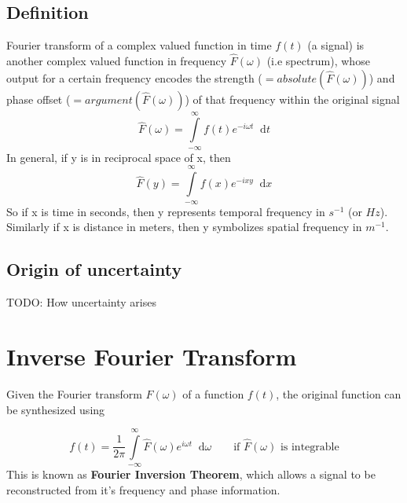 \documentclass[11pt, a4paper]{article}
\let\oldsection\section
\renewcommand{\section}{%
	\setcounter{equation}{0}%
	\oldsection%
}
\newcommand{\diff}{\mathop{}\!\mathrm{d}}
\newcommand{\dx}{\diff x}
\newcommand{\dt}{\diff t}
\newcommand{\domega}{\diff \omega}
\newcommand{\dint}[2]{\int \limits_{#1}^{#2}}  %
\newcommand{\intinfty}{\dint{-\infty}{\infty}}	%
\begin{document}
	\subsection{Definition}\label{sec:fourier_transform_def}  %
	Fourier transform of a complex valued function in time $f(t)$ (a signal) is another complex valued function in frequency $\hat{F}(\omega)$ (i.e spectrum), whose output for a certain frequency encodes the strength ($=absolute(\hat{F}(\omega))$) and phase offset ($=argument(\hat{F}(\omega))$) of that frequency within the original signal \cite{herman2016fourieranalysis}
	\begin{equation}\label{eq:ft_def}
		\boxed{
			\hat{F}(\omega) = \intinfty f(t)e^{-i\omega t} \dt
		}
	\end{equation}
	In general, if y is in reciprocal space of x, then
	\begin{equation*}\label{eq:ft_def_general}
		\hat{F}(y) = \intinfty f(x)e^{-ixy} \dx
	\end{equation*}
	So if x is time in seconds, then y represents temporal frequency in $s^{-1}$ (or $Hz$). Similarly if x is distance in meters, then y symbolizes spatial frequency in $m^{-1}$.
	
	\subsection{Origin of uncertainty}\label{sec:fourier_transform_intuitive_uncertainty}
	TODO: How uncertainty arises
	
	\section{Inverse Fourier Transform}\label{sec:inverse_fourier_transform}
	Given the Fourier transform $\hat{F}(\omega)$ of a function $f(t)$, the original function can be synthesized using
	
	\begin{equation}\label{eq:inverse_ft_def}
		\boxed{
			f(t) = \frac{1}{2\pi} \intinfty \hat{F}(\omega)e^{i\omega t} \domega
		} \qquad \text{if $\hat{F}(\omega)$ is integrable}
	\end{equation}
	This is known as \textbf{Fourier Inversion Theorem}, which allows a signal to be reconstructed from it's frequency and phase information. \cite{herman2016fourieranalysis}
	
\end{document}
